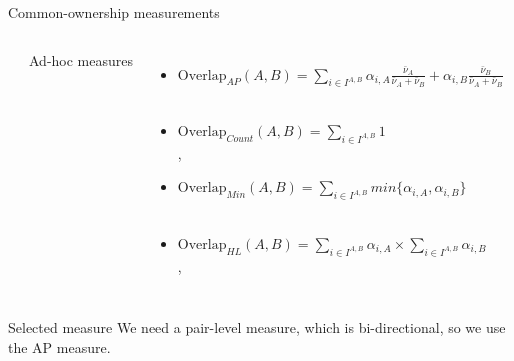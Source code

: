 \documentclass{beamer}
\begin{document}
\begin{frame}{Common-ownership measurements}
\begin{columns}[t]
\begin{itemize}
				\end{itemize}
				
				
				\pause
				\centering
				Ad-hoc measures
				\begin{itemize}
					\item \scriptsize \color{orange}  $   \text{Overlap}_{AP}(A,B)= \sum_{i\in I^{A,B}} \alpha_{i,A}\frac{\bar{\nu}_A}{\bar{\nu}_A +\bar{\nu}_B } + \alpha_{i,B}\frac{\bar{\nu}_B}{\bar{\nu}_A +\bar{\nu}_B } $  \normalcolor\\
					\tiny\cite{AntonPolk} \\ 
					
					\item \scriptsize\color{orange}  $   \text{Overlap}_{Count}{{(A,B)}}= \sum_{i\in I^{A,B}} 1 $  \normalcolor\\
					\tiny \cite{he2017product},\cite{he2019internalizing} \\ 
					
					
					\item \scriptsize\color{orange}  $   \text{Overlap}_{Min}(A,B)= \sum_{i\in I^{A,B}} min\{\alpha_{i,A},\alpha_{i,B}\} $  \normalcolor\\
					\tiny \cite{newham2018common}  \\ 
					
					
					
					
					
					\item \scriptsize\color{orange}  $   \text{Overlap}_{HL}(A,B)= \sum_{i\in I^{A,B}} \alpha_{i,A} \times \sum_{i\in I^{A,B}} \alpha_{i,B} $  \normalcolor\\
					
					\tiny \cite{hansen1996externalities} , \cite{freeman2019effects} \\ 
					
				\end{itemize}
				
			\end{columns}
			\pause
			\begin{block}{\scriptsize Selected measure }
				\scriptsize
				We need a pair-level measure, which is bi-directional, so we use the AP measure. 
			\end{block}
			\hfill
			\hyperlink{measuredetail}{}
		\end{frame}
\end{document}

